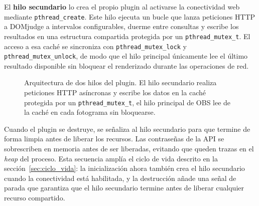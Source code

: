 El \textbf{hilo secundario} lo crea el propio plugin al activarse la conectividad web mediante
\texttt{pthread\_create}. Este hilo ejecuta un bucle que lanza peticiones HTTP a DOMjudge a
intervalos configurables, duerme entre consultas y escribe los resultados en una estructura
compartida protegida por un \texttt{pthread\_mutex\_t}. El acceso a esa caché se sincroniza con
\texttt{pthread\_mutex\_lock} y \texttt{pthread\_mutex\_unlock}, de modo que el hilo principal
únicamente lee el último resultado disponible sin bloquear el renderizado durante las operaciones
de red.
\begin{figure}[H]
\centering
{}
\caption{Arquitectura de dos hilos del plugin. El hilo secundario realiza peticiones HTTP
asíncronas y escribe los datos en la caché protegida por un \texttt{pthread\_mutex\_t}, el
hilo principal de OBS lee de la caché en cada fotograma sin bloquearse.}
\label{fig:hilos}
\end{figure}
 
Cuando el plugin se destruye, se señaliza al hilo secundario para que termine de forma limpia
antes de liberar los recursos. Las contraseñas de la API se sobrescriben en memoria antes de
ser liberadas, evitando que queden trazas en el \textit{heap} del proceso. Esta secuencia amplía
el ciclo de vida descrito en la sección~\ref{sec:ciclo_vida}: la inicialización ahora también
crea el hilo secundario cuando la conectividad está habilitada, y la destrucción añade una señal
de parada que garantiza que el hilo secundario termine antes de liberar cualquier recurso
compartido.
 
